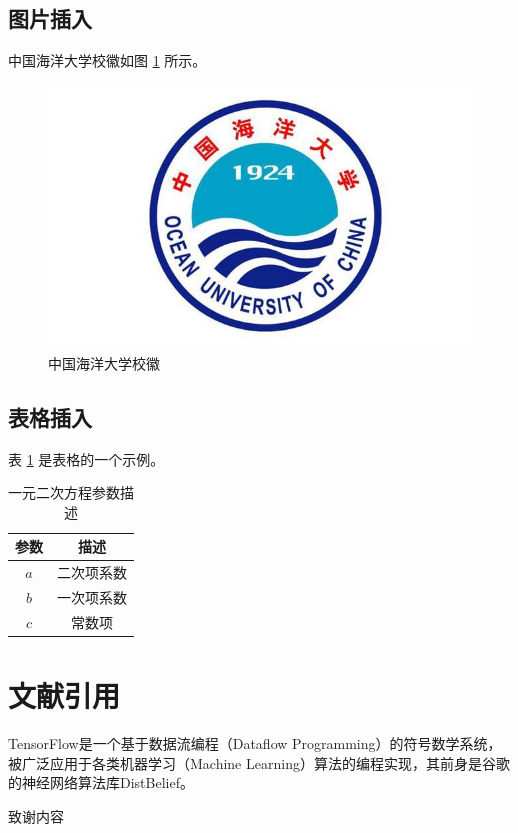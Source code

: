 \documentclass[
    Print       = false,
    Title       = 中国海洋大学硕博学位论文LaTeX模板,
    Author      = 作者,
    Advisor     = 指导教师,
    Thesis      = 全日制专业学位,
    Major       = 专业名称,
    Topic       = 研究方向,
    Year        = 2021,
    Month       = 4,
    Day         = 28,
    TitleEng    = {{LaTeX template for master's and doctoral dissertations of Ocean University of China}}
]{oucthesis}
\begin{document}
    \section{图片插入}

    中国海洋大学校徽如图 \ref{fig:ouc} 所示。

    \begin{figure}[ht]
        \centering
        \includegraphics[width=.5\textwidth]{img/ouc.jpg}
        \caption{中国海洋大学校徽}
        \label{fig:ouc}
    \end{figure}

    \section{表格插入}

    表 \ref{tab:} 是表格的一个示例。

    \begin{table}[h]
        \centering
        \caption{一元二次方程参数描述}
        \begin{tabular}{cc}
            \toprule
            参数&描述\\
            \midrule
            $a$&二次项系数\\
            $b$&一次项系数\\
            $c$&常数项\\
            \bottomrule
        \end{tabular}
        \label{tab:}
    \end{table}

    \chapter{文献引用}

    TensorFlow\cite{abadi2016tensorflow}是一个基于数据流编程（Dataflow Programming）的符号数学系统，被广泛应用于各类机器学习（Machine Learning）算法的编程实现，其前身是谷歌的神经网络算法库DistBelief。

    
    \begin{acknowledgement}
        致谢内容
    \end{acknowledgement}
\end{document}
